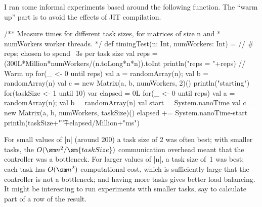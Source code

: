 \begin{answer}
I ran some informal experiments based around the following function.  The
``warm up'' part is to avoid the effects of JIT compilation.
%
\begin{scala}
  /** Measure times for different task sizes, for matrices of size n and
    * numWorkers worker threads. */
  def timingTest(n: Int, numWorkers: Int) = {
    // # reps; chosen to spend ~3s per task size
    val reps = (300L*Million*numWorkers/(n.toLong*n*n)).toInt
    println("reps = "+reps)
    // Warm up
    for(_ <- 0 until reps){
      val a = randomArray(n); val b = randomArray(n)
      val c = new Matrix(a, b, numWorkers, 2)()
    }
    println("starting")
    for(taskSize <- 1 until 10){
      var elapsed = 0L
      for(_ <- 0 until reps){
        val a = randomArray(n); val b = randomArray(n)
        val start = System.nanoTime
        val c = new Matrix(a, b, numWorkers, taskSize)()
        elapsed += System.nanoTime-start
      }
      println(taskSize+"\t"+elapsed/Million+"ms")
    }
  }
\end{scala}
%
For small values of |n| (around 200) a task size of 2 was often best; with
smaller tasks, the $O(\sm n^2/\sm{taskSize})$ communication overhead meant
that the controller was a bottleneck.  For larger values of |n|, a task size
of~1 was best; each task has $O(\sm n^2)$ computational cost, which is
sufficiently large that the controller is not a bottleneck; and having more
tasks gives better load balancing.  It might be interesting to run experiments
with smaller tasks, say to calculate part of a row of the result.
\end{answer}
